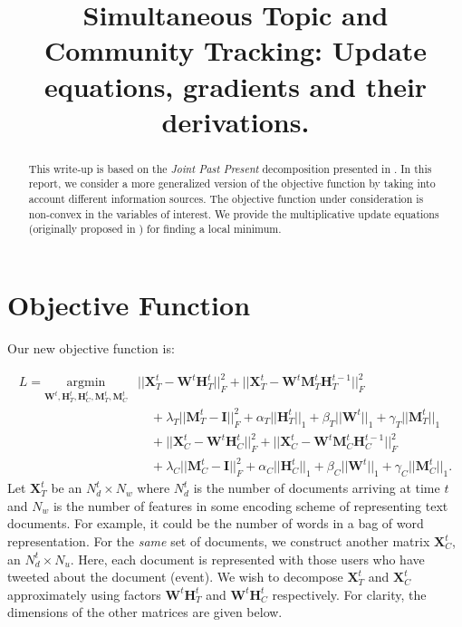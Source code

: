 \documentclass[a4paper,10pt]{article}
\newcommand{\I}{\mathcal{I}}
\newcommand{\W}{\textbf{W}^t}
\newcommand{\HT}{\textbf{H}^t_T}
\newcommand{\HC}{\textbf{H}^t_C}
\newcommand{\MT}{\textbf{M}^t_T}
\newcommand{\MC}{\textbf{M}^t_C}
\newcommand{\HTtt}{\textbf{H}^{t-1}_T}
\newcommand{\HCtt}{\textbf{H}^{t-1}_C}
\newcommand{\XT}{\textbf{X}^t_T}
\newcommand{\XC}{\textbf{X}^t_C}
\renewcommand{\I}{\textbf{I}}
\newcommand{\0}{\textbf{0}}
\begin{document}
\title{Simultaneous Topic and Community Tracking: Update equations, gradients and their derivations.}
\date{}
\maketitle

\begin{abstract}
This write-up is based on the \emph{Joint Past Present} decomposition presented
in \cite{vaca_2014}.  In this report, we consider a more
generalized version of the objective function by taking into account different
information sources.  The objective function under consideration
is non-convex in the variables of interest.  We provide the multiplicative 
update equations (originally proposed in \cite{lee_1999}) for finding a local minimum.
\end{abstract}

\section{Objective Function}

Our new objective function is:

\begin{equation}
\begin{split}
L =  \underset{\W,\HT,\HC,\MT,\MC} {\mathrm{argmin}} & ||\XT - \W\HT||^2_F + ||\XT - \W\MT\HTtt||^2_F \\
	&\quad + \lambda_T ||\MT - \I||^2_F + \alpha_T||\HT ||_1 + \beta_T|| \W||_1 + \gamma_T||\MT ||_1 \\
	&\quad +  ||\XC - \W\HC||^2_F + ||\XC - \W\MC\HCtt||^2_F \\
	&\quad + \lambda_C ||\MC - \I||^2_F + \alpha_C||\HC ||_1 + \beta_C|| \W||_1 + \gamma_C||\MC ||_1.
\end{split}
\label{eq:objective}
\end{equation}
Let $\XT$ be an $N_d^t \times N_w$ where $N_d^t$ is the number of documents arriving at time $t$ and
$N_w$ is the number of features in some encoding scheme of representing text documents.  For example,
it could be the number of words in a bag of word representation.  
For the \emph{same} set of documents, we construct another matrix
$\XC$, an $N_d^t \times N_u$.  Here, each document is represented with those users who have tweeted
about the document (event).  We wish to decompose $\XT$ and $\XC$ approximately using factors $\W\HT$ and
$\W\HC$ respectively.  For clarity, the dimensions of the other matrices are given below.
\end{document}
